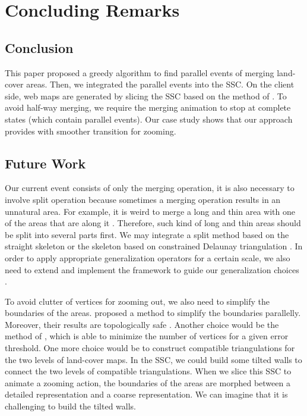 \documentclass[ijgi,article,submit,moreauthors,pdftex]{Definitions/mdpi}
\begin{document}
\section{Concluding Remarks}
\label{sec:concluding_remarks}

\subsection{Conclusion}
This paper proposed a greedy algorithm to find parallel events of 
merging land-cover areas.
Then, we integrated the parallel events into the SSC. 
On the client side, web maps are generated by slicing the SSC
based on the method of \citet{Meijers2020Web}.
To avoid half-way merging, we require the merging animation 
to stop at complete states (which contain parallel events).
Our case study shows that 
our approach provides with smoother transition for zooming.


\subsection{Future Work}



Our current event consists of only the merging operation,
it is also necessary to involve split operation
because sometimes a merging operation results in an unnatural area.
For example, it is weird to merge a long and thin area 
with one of the areas that are along it
\citep[see][]{Haunert2008Skeleton}.
Therefore, such kind of long and thin areas should be
split into several parts first.
We may integrate a split method based on the straight skeleton
\citep{Haunert2008Skeleton}
or the skeleton based on constrained Delaunay triangulation
\citep{Meijers2016Split}.
In order to apply appropriate generalization operators
for a certain scale,
we also need to extend and implement the framework 
to guide our generalization choices
\citep{Meijers2018Framework}.

To avoid clutter of vertices for zooming out, 
we also need to simplify the boundaries of the areas.
\citet{Meijers2011LineSimp} proposed a method 
to simplify the boundaries parallelly. 
Moreover, their results are topologically safe . 
Another choice would be the method of \citet{ImaiIri1988},
which is able to minimize the number of vertices 
for a given error threshold.
One more choice would be to construct compatible triangulations 
\citep[see][]{Peng2019Thesis}
for the two levels of land-cover maps.
In the SSC, we could build some tilted walls 
to connect the two levels of compatible triangulations.
When we slice this SSC to animate a zooming action,
the boundaries of the areas are morphed 
between a detailed representation and a coarse representation.
We can imagine that it is challenging to build the tilted walls.
\end{document}
